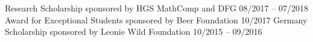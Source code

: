 \vspace*{-0.2cm}
\begin{cvhonors}
  \cvhonor
    {Research Scholarship}
    {sponsored by HGS MathComp and DFG}
    {}
    {08/2017 -- 07/2018}
  \cvhonor
    {Award for Exceptional Students}
    {sponsored by Beer Foundation}
    {}
    {10/2017}
  \cvhonor
    {Germany Scholarship}
    {sponsored by Leonie Wild Foundation}
    {}
    {10/2015 -- 09/2016}
\end{cvhonors}
